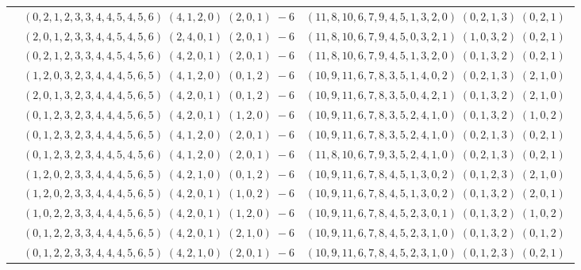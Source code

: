 \documentclass[11pt]{article}
\begin{document}
\begin{longtable}[l]{|c|c|c|}
 \cline{2-3} 
 & $(0 ,2 ,1 ,2 ,3 ,3 ,4 ,4 ,5 ,4 ,5 ,6) \;(4 ,1 ,2 ,0) \;(2 ,0 ,1) \;-6$ & $(11 ,8 ,10 ,6 ,7 ,9 ,4 ,5 ,1 ,3 ,2 ,0) \;(0 ,2 ,1 ,3) \;(0 ,2 ,1) \;$\\ 
 \cline{2-3} 
 & $(2 ,0 ,1 ,2 ,3 ,3 ,4 ,4 ,5 ,4 ,5 ,6) \;(2 ,4 ,0 ,1) \;(2 ,0 ,1) \;-6$ & $(11 ,8 ,10 ,6 ,7 ,9 ,4 ,5 ,0 ,3 ,2 ,1) \;(1 ,0 ,3 ,2) \;(0 ,2 ,1) \;$\\ 
 \cline{2-3} 
 & $(0 ,2 ,1 ,2 ,3 ,3 ,4 ,4 ,5 ,4 ,5 ,6) \;(4 ,2 ,0 ,1) \;(2 ,0 ,1) \;-6$ & $(11 ,8 ,10 ,6 ,7 ,9 ,4 ,5 ,1 ,3 ,2 ,0) \;(0 ,1 ,3 ,2) \;(0 ,2 ,1) \;$\\ 
 \cline{2-3} 
 & $(1 ,2 ,0 ,3 ,2 ,3 ,4 ,4 ,4 ,5 ,6 ,5) \;(4 ,1 ,2 ,0) \;(0 ,1 ,2) \;-6$ & $(10 ,9 ,11 ,6 ,7 ,8 ,3 ,5 ,1 ,4 ,0 ,2) \;(0 ,2 ,1 ,3) \;(2 ,1 ,0) \;$\\ 
 \cline{2-3} 
 & $(2 ,0 ,1 ,3 ,2 ,3 ,4 ,4 ,4 ,5 ,6 ,5) \;(4 ,2 ,0 ,1) \;(0 ,1 ,2) \;-6$ & $(10 ,9 ,11 ,6 ,7 ,8 ,3 ,5 ,0 ,4 ,2 ,1) \;(0 ,1 ,3 ,2) \;(2 ,1 ,0) \;$\\ 
 \cline{2-3} 
 & $(0 ,1 ,2 ,3 ,2 ,3 ,4 ,4 ,4 ,5 ,6 ,5) \;(4 ,2 ,0 ,1) \;(1 ,2 ,0) \;-6$ & $(10 ,9 ,11 ,6 ,7 ,8 ,3 ,5 ,2 ,4 ,1 ,0) \;(0 ,1 ,3 ,2) \;(1 ,0 ,2) \;$\\ 
 \cline{2-3} 
 & $(0 ,1 ,2 ,3 ,2 ,3 ,4 ,4 ,4 ,5 ,6 ,5) \;(4 ,1 ,2 ,0) \;(2 ,0 ,1) \;-6$ & $(10 ,9 ,11 ,6 ,7 ,8 ,3 ,5 ,2 ,4 ,1 ,0) \;(0 ,2 ,1 ,3) \;(0 ,2 ,1) \;$\\ 
 \cline{2-3} 
 & $(0 ,1 ,2 ,3 ,2 ,3 ,4 ,4 ,5 ,4 ,5 ,6) \;(4 ,1 ,2 ,0) \;(2 ,0 ,1) \;-6$ & $(11 ,8 ,10 ,6 ,7 ,9 ,3 ,5 ,2 ,4 ,1 ,0) \;(0 ,2 ,1 ,3) \;(0 ,2 ,1) \;$\\ 
 \cline{2-3} 
 & $(1 ,2 ,0 ,2 ,3 ,3 ,4 ,4 ,4 ,5 ,6 ,5) \;(4 ,2 ,1 ,0) \;(0 ,1 ,2) \;-6$ & $(10 ,9 ,11 ,6 ,7 ,8 ,4 ,5 ,1 ,3 ,0 ,2) \;(0 ,1 ,2 ,3) \;(2 ,1 ,0) \;$\\ 
 \cline{2-3} 
 & $(1 ,2 ,0 ,2 ,3 ,3 ,4 ,4 ,4 ,5 ,6 ,5) \;(4 ,2 ,0 ,1) \;(1 ,0 ,2) \;-6$ & $(10 ,9 ,11 ,6 ,7 ,8 ,4 ,5 ,1 ,3 ,0 ,2) \;(0 ,1 ,3 ,2) \;(2 ,0 ,1) \;$\\ 
 \cline{2-3} 
 & $(1 ,0 ,2 ,2 ,3 ,3 ,4 ,4 ,4 ,5 ,6 ,5) \;(4 ,2 ,0 ,1) \;(1 ,2 ,0) \;-6$ & $(10 ,9 ,11 ,6 ,7 ,8 ,4 ,5 ,2 ,3 ,0 ,1) \;(0 ,1 ,3 ,2) \;(1 ,0 ,2) \;$\\ 
 \cline{2-3} 
 & $(0 ,1 ,2 ,2 ,3 ,3 ,4 ,4 ,4 ,5 ,6 ,5) \;(4 ,2 ,0 ,1) \;(2 ,1 ,0) \;-6$ & $(10 ,9 ,11 ,6 ,7 ,8 ,4 ,5 ,2 ,3 ,1 ,0) \;(0 ,1 ,3 ,2) \;(0 ,1 ,2) \;$\\ 
 \cline{2-3} 
 & $(0 ,1 ,2 ,2 ,3 ,3 ,4 ,4 ,4 ,5 ,6 ,5) \;(4 ,2 ,1 ,0) \;(2 ,0 ,1) \;-6$ & $(10 ,9 ,11 ,6 ,7 ,8 ,4 ,5 ,2 ,3 ,1 ,0) \;(0 ,1 ,2 ,3) \;(0 ,2 ,1) \;$\\ 

\end{longtable}
\end{document}
